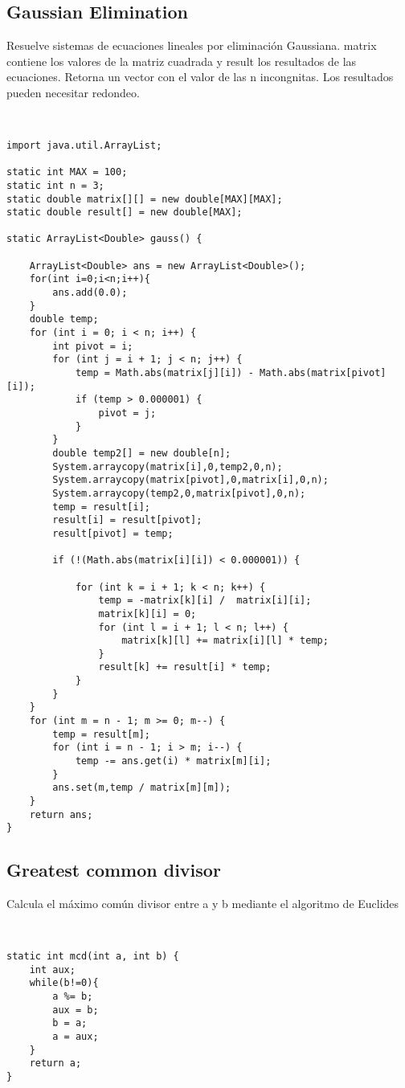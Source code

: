 \documentclass[11pt,letterpaper,twocolumn,twosided]{article}
\begin{document}
\subsection{Gaussian Elimination}
Resuelve sistemas de ecuaciones lineales por eliminaci\'on Gaussiana. matrix contiene los valores de la matriz cuadrada y result los resultados de las ecuaciones. Retorna un vector con el valor de las n incongnitas. Los resultados pueden necesitar redondeo.
\begin{lstlisting}


import java.util.ArrayList;

static int MAX = 100;
static int n = 3;
static double matrix[][] = new double[MAX][MAX];
static double result[] = new double[MAX];

static ArrayList<Double> gauss() {
	
  	ArrayList<Double> ans = new ArrayList<Double>();
  	for(int i=0;i<n;i++){
  		ans.add(0.0);
  	}
  	double temp;
	for (int i = 0; i < n; i++) {
    	int pivot = i;
	    for (int j = i + 1; j < n; j++) {
	    	temp = Math.abs(matrix[j][i]) - Math.abs(matrix[pivot][i]);
	      	if (temp > 0.000001) {
	        	pivot = j;
	      	}
	    }
	    double temp2[] = new double[n];
	    System.arraycopy(matrix[i],0,temp2,0,n);
	    System.arraycopy(matrix[pivot],0,matrix[i],0,n);
	    System.arraycopy(temp2,0,matrix[pivot],0,n);
	    temp = result[i];
	    result[i] = result[pivot];
	    result[pivot] = temp;
	    
	    if (!(Math.abs(matrix[i][i]) < 0.000001)) {
	    	
	    	for (int k = i + 1; k < n; k++) {
		      	temp = -matrix[k][i] /  matrix[i][i];
		      	matrix[k][i] = 0;
		      	for (int l = i + 1; l < n; l++) {
		        	matrix[k][l] += matrix[i][l] * temp;
		      	}
		      	result[k] += result[i] * temp;
		    }
	    }
  	}
  	for (int m = n - 1; m >= 0; m--) {
    	temp = result[m];
    	for (int i = n - 1; i > m; i--) {
    		temp -= ans.get(i) * matrix[m][i];
    	}
    	ans.set(m,temp / matrix[m][m]);
  	}
  	return ans;
}
\end{lstlisting}

\subsection{Greatest common divisor}
Calcula el m\'aximo com\'un divisor entre a y b mediante el algoritmo de Euclides
\begin{lstlisting}


static int mcd(int a, int b) {
	int aux;
	while(b!=0){
		a %= b;
		aux = b;
		b = a;
		a = aux;
	}
	return a;
}
\end{lstlisting}
\end{document}
